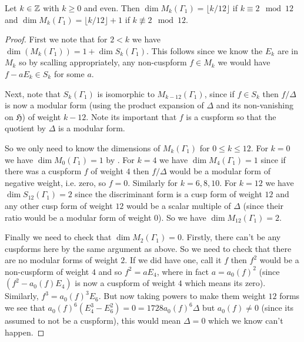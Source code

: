 \begin{theorem}\label{thm:lvl1_dims}\leanok
    Let $k \in \mathbb{Z}$ with $k \ge 0$ and even. Then $\dim M_k(\Gamma_1) = \lfloor k / 12 \rfloor $ if $k \equiv 2 \mod 12$ and $\dim M_k(\Gamma_1) = \lfloor k / 12 \rfloor + 1$ if $k \not\equiv 2 \mod 12$.
\end{theorem}
\begin{proof}

First we note that for $2 < k$ we have $\dim(M_k(\Gamma_1)) = 1 + \dim S_k(\Gamma_1)$. This follows since we know the $E_k$ are in $M_k$ so by scalling appropriately, any non-cuspform $f \in M_k$ we would have $f - a E_k \in S_k$ for some $a$.

Next, note that  $S_k(\Gamma_1)$ is isomorphic to $M_{k-12}(\Gamma_1)$, since if $f \in S_k$ then $f/ \Delta$ is now a modular form (using the product expansion of $\Delta$ and its non-vanishing on $\mathfrak{H}$) of weight $k-12$. Note its important that $f$ is a cuspform so that the quotient by $\Delta$ is a modular form.

So we only need to know the dimensions of $M_k(\Gamma_1)$ for $0 \le k \le 12$. For $k = 0$ we have $\dim M_0(\Gamma_1) = 1$ by .  For $k = 4$ we have $\dim M_4(\Gamma_1) = 1$ since if there was a cuspform $f$ of weight $4$ then $f/ \Delta$ would be a modular form of negative weight, i.e. zero, so $f=0$. Similarly for $k=6,8,10$. For $k=12$ we have $\dim S_{12}(\Gamma_1) = 2$ since the discriminant form is a cusp form of weight $12$ and any other cusp form of weight $12$ would be a scalar multiple of $\Delta$ (since their ratio would be a modular form of weight $0$). So we have $\dim M_{12}(\Gamma_1) = 2$.

Finally we need to check that $\dim M_2(\Gamma_1) = 0$. Firstly, there can't be any cuspforms here by the same argument as above. So we need to check that there are no modular forms of weight $2$. If we did have one, call it $f$ then $f^2$ would be a non-cuspform of weight $4$ and so $f^2 = a E_4$, where in fact $a=a_0(f)^2$ (since $(f^2-a_0(f)E_4)$ is now a cuspform of weight $4$ which means its zero). Similarly, $f^3 = a_0(f)^3 E_6$. But now taking powers to make them weight $12$ forms we see that $a_0(f)^6(E_4^3 - E_6^2) = 0 = 1728 a_0(f)^6 \Delta$
but $a_0(f) \ne 0$ (since its assumed to not be a cuspform), this would mean $\Delta =0$ which we know can't happen.


\end{proof}

